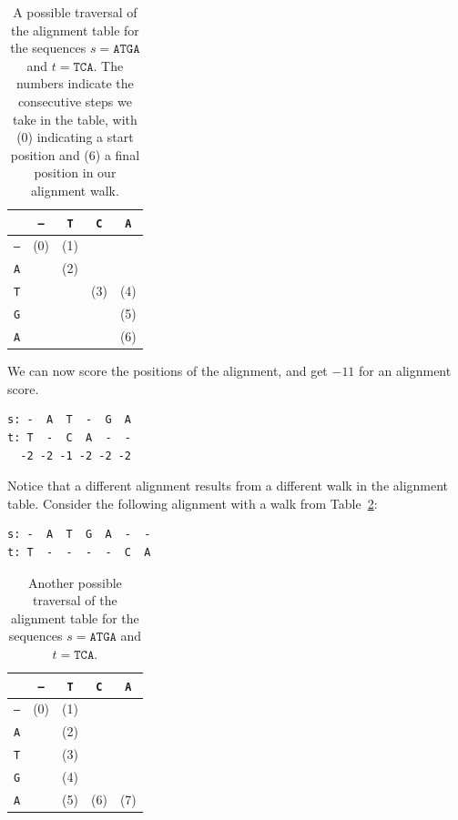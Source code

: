 \begin{table}[h!]
\centering
\caption{A possible traversal of the alignment table for the sequences $s=\texttt{ATGA}$ and $t=\texttt{TCA}$. The numbers indicate the consecutive steps we take in the table, with (0) indicating a start position and (6) a final position in our alignment walk.}
\label{t:align-table-1}
\begin{tabular}{c|cccc}
\hline
 & \texttt{–} & \texttt{T} & \texttt{C} & \texttt{A} \\
\hline
\texttt{–} & (0) & (1) &  &  \\
\texttt{A} &  & (2) &  &  \\
\texttt{T} &  &  & (3) &  (4) \\
\texttt{G} &  &  &  & (5) \\
\texttt{A} &  &  &  &  (6) \\
\hline
\end{tabular}
\end{table}

We can now score the positions of the alignment, and get $-11$ for an alignment score.

\begin{verbatim}
s: -  A  T  -  G  A
t: T  -  C  A  -  -
  -2 -2 -1 -2 -2 -2
\end{verbatim}

Notice that a different alignment results from a different walk in the alignment table. Consider the following alignment with a walk from Table~\ref{t:align-table-2}:

\begin{verbatim}
s: -  A  T  G  A  -  -
t: T  -  -  -  -  C  A
\end{verbatim}

\begin{table}[h!]
\centering
\caption{Another possible traversal of the alignment table for the sequences $s=\texttt{ATGA}$ and $t=\texttt{TCA}$.}
\label{t:align-table-2}
\begin{tabular}{c|cccc}
\hline
 & \texttt{–} & \texttt{T} & \texttt{C} & \texttt{A} \\
\hline
\texttt{–} & (0) & (1) &     &  \\
\texttt{A} &     & (2) &     &  \\
\texttt{T} &     & (3) &     &  \\
\texttt{G} &     & (4) &     &  \\
\texttt{A} &     & (5) & (6) & (7) \\
\hline
\end{tabular}
\end{table}

